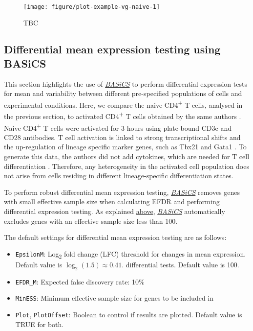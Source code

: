\documentclass[9pt,a4paper,]{extarticle}
\begin{document}
\begin{figure}

{\centering \texttt{[image: figure/plot-example-vg-naive-1]} 

}

\caption{TBC}\label{fig:plot-example-vg-naive}
\end{figure}

\hypertarget{differential-mean-expression-testing-using-basics}{%
\subsection{Differential mean expression testing using BASiCS}\label{differential-mean-expression-testing-using-basics}}

This section highlights the use of \emph{\href{https://bioconductor.org/packages/3.11/BASiCS}{BASiCS}} to perform differential
expression tests for mean and variability between different pre-specified
populations of cells and experimental conditions.
Here, we compare the naive CD4\textsuperscript{+} T cells, analysed in the previous section, to
activated CD4\textsuperscript{+} T cells obtained by the same authors \citep{Martinez-jimenez2017}.
Naive CD4\textsuperscript{+} T cells were activated for 3 hours
using plate-bound CD3e and CD28 antibodies.
T cell activation is linked to strong transcriptional shifts and the
up-regulation of lineage specific marker genes, such as Tbx21 and Gata1
\citep{Best2013, Fu2012}.
To generate this data, the authors did not add cytokines, which are needed for
T cell differentiation \citep{Zhu2010}. Therefore, any heterogeneity in the activated
cell population does not arise from cells residing in different lineage-specific
differentiation states.

To perform robust differential mean expression testing, \emph{\href{https://bioconductor.org/packages/3.11/BASiCS}{BASiCS}}
removes genes with small effective sample size when calculating EFDR and
performing differential expression testing.
As explained \protect\hyperlink{naive-convergence}{above}, \emph{\href{https://bioconductor.org/packages/3.11/BASiCS}{BASiCS}} automatically
excludes genes with an effective sample size less than 100.

The default settings for differential mean expression testing are as follows:

\begin{itemize}
\item
  \texttt{EpsilonM}: Log\textsubscript{2} fold change (LFC) threshold for changes in mean expression.
  Default value is \(\log_2(1.5)\approx0.41\).
  differential tests. Default value is 100.
\item
  \texttt{EFDR\_M}: Expected false discovery rate: 10\%
\item
  \texttt{MinESS}: Minimum effective sample size for genes to be included in
\item
  \texttt{Plot}, \texttt{PlotOffset}: Boolean to control if results are plotted.
  Default value is TRUE for both.
\end{itemize}
\end{document}
